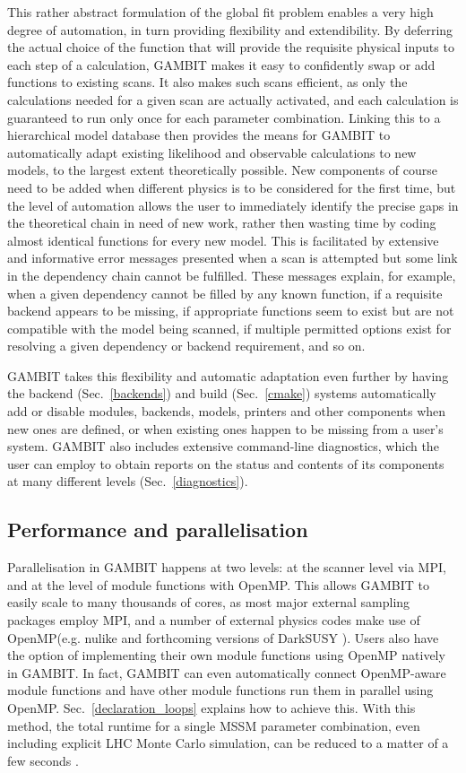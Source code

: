 \documentclass[pdftex,twocolumn,epjc3_preprint,runningheads]{svjour3}
\renewcommand{\_}{\discretionary{\underscore}{}{\underscore}}
\newcommand{\gambit}{\textsf{GAMBIT}\xspace}
\newcommand{\GB}{\gambit}
\newcommand{\omp}{\textsf{OpenMP}\xspace}
\newcommand{\mpi}{\textsf{MPI}\xspace}
\begin{document}
This rather abstract formulation of the global fit problem enables a very high degree of automation, in turn providing flexibility and extendibility.  By deferring the actual choice of the function that will provide the requisite physical inputs to each step of a calculation, \GB makes it easy to confidently swap or add functions to existing scans.  It also makes such scans efficient, as only the calculations needed for a given scan are actually activated, and each calculation is guaranteed to run only once for each parameter combination.  Linking this to a hierarchical model database then provides the means for \GB to automatically adapt existing likelihood and observable calculations to new models, to the largest extent theoretically possible.  New components of course need to be added when different physics is to be considered for the first time, but the level of automation allows the user to immediately identify the precise gaps in the theoretical chain in need of new work, rather then wasting time by coding almost identical functions for every new model.  This is facilitated by extensive and informative error messages presented when a scan is attempted but some link in the dependency chain cannot be fulfilled.  These messages explain, for example, when a given dependency cannot be filled by any known function, if a requisite backend appears to be missing, if appropriate functions seem to exist but are not compatible with the model being scanned, if multiple permitted options exist for resolving a given dependency or backend requirement, and so on.

\GB takes this flexibility and automatic adaptation even further by having the backend (Sec.\ \ref{backends}) and build (Sec.\ \ref{cmake}) systems automatically add or disable modules, backends, models, printers and other components when new ones are defined, or when existing ones happen to be missing from a user's system.  \GB also includes extensive command-line diagnostics, which the user can employ to obtain reports on the status and contents of its components at many different levels (Sec.\ \ref{diagnostics}).

\subsection{Performance and parallelisation}

Parallelisation in \GB happens at two levels: at the scanner level via \mpi \cite{MPI}, and at the level of module functions with \omp \cite{openmp}.  This allows \GB to easily scale to many thousands of cores, as most major external sampling packages employ \mpi, and a number of external physics codes make use of \omp (e.g. \textsf{nulike} \cite{IC79_SUSY} and forthcoming versions of \textsf{DarkSUSY} \cite{darksusy}).  Users also have the option of implementing their own module functions using \omp natively in \GB.  In fact, \GB can even automatically connect \omp-aware module functions and have other module functions run them in parallel using \omp.  Sec.\ \ref{declaration_loops} explains how to achieve this.  With this method, the total runtime for a single MSSM parameter combination, even including explicit LHC Monte Carlo simulation, can be reduced to a matter of a few seconds \cite{ColliderBit}.
\end{document}
